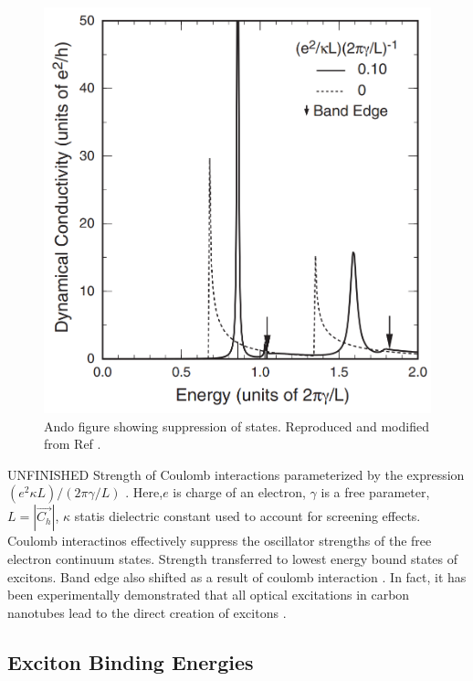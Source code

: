  \begin{figure}[H]
 	\centering
 	\includegraphics[scale=0.4]{images/chapter_optical_props/ando_suppression}
 	\caption{Ando figure showing suppression of states. Reproduced and modified from Ref \cite{ando2005theory}.}
 	\label{fig:ando_suppression}
 \end{figure}

{\color{red} UNFINISHED} Strength of Coulomb interactions parameterized by the expression $(e^2 \kappa L)/(2 \pi \gamma/L) $ \cite{ando1997excitons}. Here,$e$ is charge of an electron, $\gamma$ is a free parameter, $L = |\vec{C_h} |$, $\kappa$ statis dielectric constant used to account for screening effects. Coulomb interactinos effectively suppress the oscillator strengths of the free electron continuum states. Strength transferred to lowest energy bound states of excitons. Band edge also shifted as a result of coulomb interaction \cite{ando1997excitons}. In fact, it has been experimentally demonstrated that all optical excitations in carbon nanotubes lead to the direct creation of excitons \cite{wang2005optical}. 



\subsection{Exciton Binding Energies}


